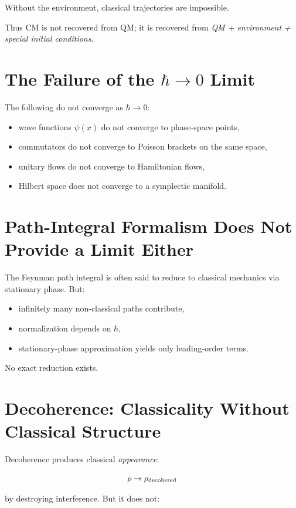 \documentclass[12pt]{article}
\begin{document}
Without the environment, classical trajectories are impossible.

Thus CM is not recovered from QM; it is recovered from \emph{QM + environment + special initial conditions}.

\section{The Failure of the $\hbar\to 0$ Limit}

The following do not converge as $\hbar \to 0$:

\begin{itemize}
    \item wave functions $\psi(x)$ do not converge to phase-space points,
    \item commutators do not converge to Poisson brackets on the same space,
    \item unitary flows do not converge to Hamiltonian flows,
    \item Hilbert space does not converge to a symplectic manifold.
\end{itemize}

\section{Path-Integral Formalism Does Not Provide a Limit Either}

The Feynman path integral is often said to reduce to classical mechanics via stationary phase. But:

\begin{itemize}
    \item infinitely many non-classical paths contribute,
    \item normalization depends on $\hbar$,
    \item stationary-phase approximation yields only leading-order terms.
\end{itemize}

No exact reduction exists.

\section{Decoherence: Classicality Without Classical Structure}

Decoherence produces classical \emph{appearance}:

\[
\rho \to \rho_{\rm decohered}
\]

by destroying interference. But it does not:
\end{document}
